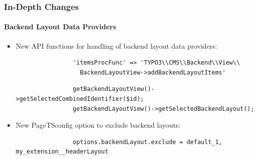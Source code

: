 \begin{frame}[fragile]
	\frametitle{In-Depth Changes}
	\framesubtitle{Backend Layout Data Providers}

	\begin{itemize}
		\item New API functions for handling of backend layout data providers:

			\begin{lstlisting}
				'itemsProcFunc' => 'TYPO3\\CMS\\Backend\\View\\
				  BackendLayoutView->addBackendLayoutItems'
			\end{lstlisting}

			\begin{lstlisting}
				getBackendLayoutView()->getSelectedCombinedIdentifier($id);
				getBackendLayoutView()->getSelectedBackendLayout();
			\end{lstlisting}

		\item New PageTSconfig option to exclude backend layouts:

			\begin{lstlisting}
				options.backendLayout.exclude = default_1, my_extension__headerLayout
			\end{lstlisting}

	\end{itemize}

\end{frame}


